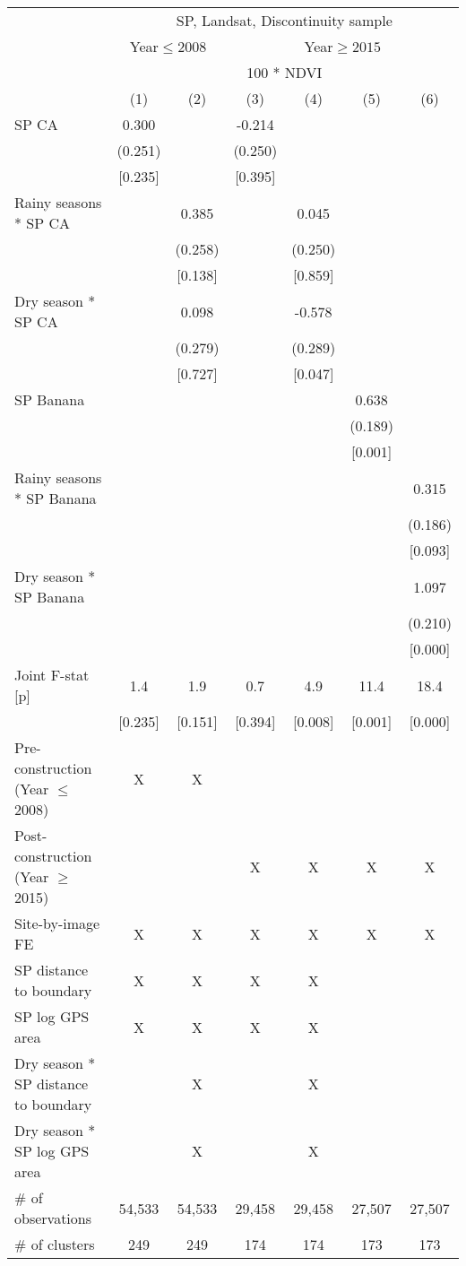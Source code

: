 \begin{tabular}{lcccccc}
\hline \hline
 & \multicolumn{6}{c}{SP, Landsat, Discontinuity sample} \\
\cmidrule(lr){2-7}
 & \multicolumn{2}{c}{Year$\leq 2008$} & \multicolumn{4}{c}{Year$\geq 2015$} \\
\cmidrule(lr){2-3}\cmidrule(lr){4-7}
 & \multicolumn{6}{c}{100 * NDVI} \\
\cmidrule(lr){2-7}
 & (1) & (2) & (3) & (4) & (5) & (6) \\
\hline
SP CA & 0.300 &  & -0.214\hphantom{-} &  &  &  \\
 & (0.251) &  & (0.250) &  &  &  \\
 & [0.235] &  & [0.395] &  &  &  \\
Rainy seasons * SP CA &  & 0.385 &  & 0.045 &  &  \\
 &  & (0.258) &  & (0.250) &  &  \\
 &  & [0.138] &  & [0.859] &  &  \\
Dry season * SP CA &  & 0.098 &  & -0.578\hphantom{-} &  &  \\
 &  & (0.279) &  & (0.289) &  &  \\
 &  & [0.727] &  & [0.047] &  &  \\
SP Banana &  &  &  &  & 0.638 &  \\
 &  &  &  &  & (0.189) &  \\
 &  &  &  &  & [0.001] &  \\
Rainy seasons * SP Banana &  &  &  &  &  & 0.315 \\
 &  &  &  &  &  & (0.186) \\
 &  &  &  &  &  & [0.093] \\
Dry season * SP Banana &  &  &  &  &  & 1.097 \\
 &  &  &  &  &  & (0.210) \\
 &  &  &  &  &  & [0.000] \\
Joint F-stat [p] & 1.4 & 1.9 & 0.7 & 4.9 & 11.4 & 18.4 \\
 & [0.235] & [0.151] & [0.394] & [0.008] & [0.001] & [0.000] \\
\hline
Pre-construction (Year $\leq$2008) & X & X &  &  &  &  \\
Post-construction (Year $\geq$2015) &  &  & X & X & X & X \\
Site-by-image FE & X & X & X & X & X & X \\
SP distance to boundary & X & X & X & X &  &  \\
SP log GPS area & X & X & X & X &  &  \\
Dry season * SP distance to boundary &  & X &  & X &  &  \\
Dry season * SP log GPS area &  & X &  & X &  &  \\
\# of observations & 54,533 & 54,533 & 29,458 & 29,458 & 27,507 & 27,507 \\
\# of clusters & 249 & 249 & 174 & 174 & 173 & 173 \\
\hline
\end{tabular}
